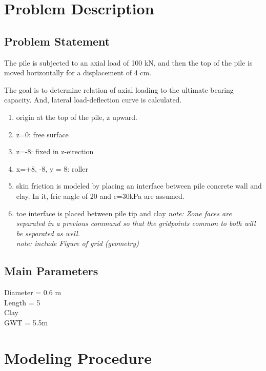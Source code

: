 \documentclass[a4paper, nobind]{templates/ociamthesis}
\providecommand{\tightlist}{%
  \setlength{\itemsep}{0pt}\setlength{\parskip}{0pt}}
\begin{document}
\hypertarget{problem-description}{%
\section{Problem Description}\label{problem-description}}

\hypertarget{problem-statement}{%
\subsection{Problem Statement}\label{problem-statement}}

The pile is subjected to an axial load of 100 kN, and then the top of
the pile is moved horizontally for a displacement of 4 cm.

The goal is to determine relation of axial loading to the ultimate
bearing capacity. And, lateral load-deflection curve is calculated.

\begin{enumerate}
\def\labelenumi{\arabic{enumi})}
\tightlist
\item
  origin at the top of the pile, z upward.
\item
  z=0: free surface
\item
  z=-8: fixed in z-eirection
\item
  x=+8, -8, y = 8: roller
\item
  skin friction is modeled by placing an interface between pile
  concrete wall and clay. In it, fric angle of 20 and c=30kPa are
  assumed.
\item
  toe interface is placed between pile tip and clay \emph{note: Zone faces
  are separated in a previous command so that the gridpoints common to
  both will be separated as well.}\\
  \emph{note: include Figure of grid (geometry)}
\end{enumerate}

\hypertarget{main-parameters}{%
\subsection{Main Parameters}\label{main-parameters}}

Diameter = 0.6 m\\
Length = 5\\
Clay\\
GWT = 5.5m\\

\hypertarget{modeling-procedure}{%
\section{Modeling Procedure}\label{modeling-procedure}}
\end{document}

